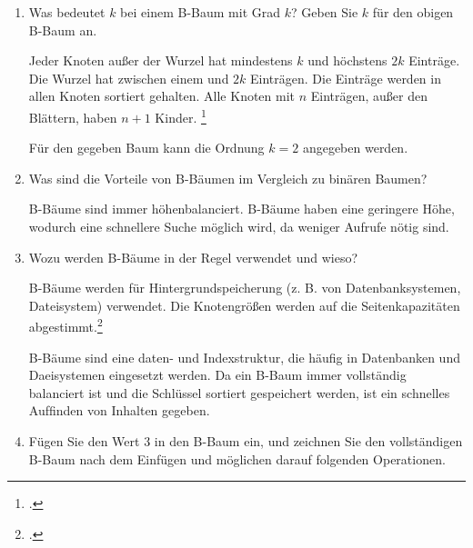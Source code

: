 \documentclass{lehramt-informatik-aufgabe}
\begin{document}
\begin{enumerate}


\item Was bedeutet $k$ bei einem B-Baum mit Grad $k$? Geben Sie $k$ für
den obigen B-Baum an.

\begin{liAntwort}
Jeder Knoten außer der Wurzel hat mindestens $k$ und höchstens $2k$
Einträge. Die Wurzel hat zwischen einem und $2k$ Einträgen. Die Einträge
werden in allen Knoten sortiert gehalten. Alle Knoten mit $n$ Einträgen,
außer den Blättern, haben $n + 1$ Kinder.
\footcite[Seite 225]{kemper}

Für den gegeben Baum kann die Ordnung $k = 2$ angegeben werden.
\end{liAntwort}


\item Was sind die Vorteile von B-Bäumen im Vergleich zu binären Baumen?

\begin{liAntwort}
B-Bäume sind immer höhenbalanciert. B-Bäume haben eine geringere Höhe,
wodurch eine schnellere Suche möglich wird, da weniger Aufrufe nötig
sind.
\end{liAntwort}


\item Wozu werden B-Bäume in der Regel verwendet und wieso?

\begin{liAntwort}
B-Bäume werden für Hintergrundspeicherung (z. B. von Datenbanksystemen,
Dateisystem) verwendet. Die Knotengrößen werden auf die
Seitenkapazitäten abgestimmt.\footcite[Seite 223]{kemper}

B-Bäume sind eine daten- und Indexstruktur, die häuﬁg in Datenbanken und
Daeisystemen eingesetzt werden. Da ein B-Baum immer vollständig
balanciert ist und die Schlüssel sortiert gespeichert werden, ist ein
schnelles Aufﬁnden von Inhalten gegeben.
\end{liAntwort}


\item Fügen Sie den Wert $3$ in den B-Baum ein, und zeichnen Sie den
vollständigen B-Baum nach dem Einfügen und möglichen darauf folgenden
Operationen.


\end{enumerate}
\end{document}

